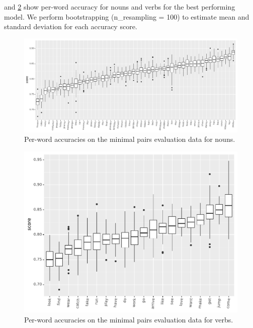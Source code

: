  and
\ref{fig:accuracy_targeted_triplets_verbs} show per-word
accuracy for nouns and verbs for the best performing model.
We perform bootstrapping (n\_resampling = 100) to estimate mean and standard 
deviation for each accuracy score.


\begin{figure}[htb]
  \centering
  \includegraphics[width=\textwidth]{results/targeted_triplets/results_per_word_version_335_NOUN.pdf}
  \caption{Per-word accuracies on the minimal pairs evaluation data for nouns.}
  \label{fig:accuracy_targeted_triplets_nouns}
\end{figure}

\begin{figure}[htb]
  \centering
  \includegraphics[width=\linewidth]{results/targeted_triplets/results_per_word_version_335_VERB.pdf}
  \caption{Per-word accuracies on the minimal pairs evaluation data
    for verbs.}
  \label{fig:accuracy_targeted_triplets_verbs}
\end{figure}


